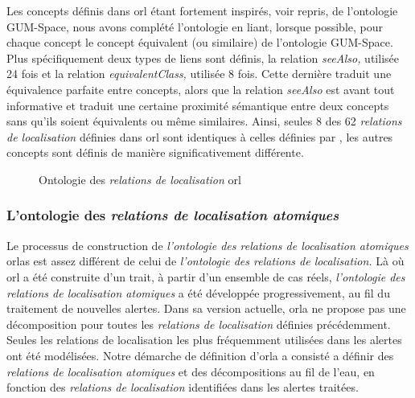 Les concepts définis dans \ac{orl} étant fortement inspirés, voir
repris, de l'ontologie GUM-Space, nous avons complété l'ontologie en
liant, lorsque possible, pour chaque concept le concept équivalent (ou
similaire) de l'ontologie GUM-Space. Plus spécifiquement deux types de
liens sont définis, la relation \emph{seeAlso,} utilisée 24 fois et la
relation \emph{equivalentClass,} utilisée 8 fois. Cette dernière
traduit une équivalence parfaite entre concepts, alors que la relation
\emph{seeAlso} est avant tout informative et traduit une certaine
proximité sémantique entre deux concepts sans qu'ils soient
équivalents ou même similaires. Ainsi, seules 8 des 62 \emph{relations
  de localisation} définies dans \ac{orl} sont identiques à celles
définies par \textcite{Bateman2010}, les autres concepts sont définis
de manière significativement différente.

\begin{figure}
  \centering
  
  \caption{Ontologie des \emph{relations de localisation} \ac{orl}}
  \label{fig:ontho}
\end{figure}

\subsubsection{L'ontologie des \emph{relations de localisation
    atomiques}}

Le processus de construction de \emph{l'ontologie des relations de
  localisation atomiques} \acp{orla} est assez différent de celui de
\emph{l'ontologie des relations de localisation.} Là où \ac{orl} a été
construite d'un trait, à partir d'un ensemble de cas réels,
\emph{l'ontologie des relations de localisation atomiques} a été
développée progressivement, au fil du traitement de nouvelles
alertes. Dans sa version actuelle, \ac{orla} ne propose pas une
décomposition pour toutes les \emph{relations de localisation}
définies précédemment. Seules les relations de localisation les plus
fréquemment utilisées dans les alertes ont été modélisées. Notre
démarche de définition d'\ac{orla} a consisté a définir des
\emph{relations de localisation atomiques} et des décompositions au
fil de l'eau, en fonction des \emph{relations de localisation}
identifiées dans les alertes traitées.

